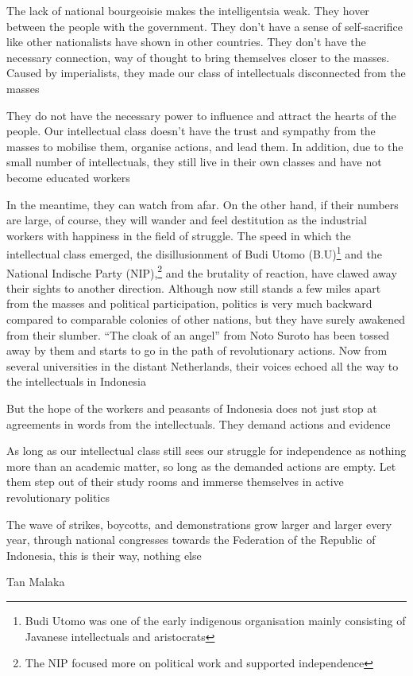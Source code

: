 The lack of national bourgeoisie makes the intelligentsia weak. They hover between the people with the government. 
They don't have a sense of self-sacrifice like other nationalists have shown in other countries. They don't have the 
necessary connection, way of thought to bring themselves closer to the masses. Caused by imperialists, they made our class 
of intellectuals disconnected from the masses\vskip 0.2in

They do not have the necessary power to influence and attract the hearts of the people. Our 
intellectual class doesn't have the trust and sympathy from the masses to mobilise them, organise actions, 
and lead them. In addition, due to the small number of intellectuals, they still live in their own classes and 
have not become educated workers\vskip 0.2in

In the meantime, they can watch from afar. On the other hand, if their numbers are large, of course, 
they will wander and feel destitution as the industrial workers with happiness in the field of struggle.
The speed in which the intellectual class emerged, the disillusionment of Budi Utomo (B.U)\footnote[2]{Budi Utomo was one of the early indigenous organisation mainly consisting of Javanese intellectuals and aristocrats}
and the National Indische Party (NIP),\footnote[3]{The NIP focused more on political work and supported independence}
and the brutality of reaction, have clawed away their sights to another direction. Although now still stands a few miles apart 
from the masses and political participation, politics is very much backward compared to comparable colonies of other nations, 
but they have surely awakened from their slumber. “The cloak of an angel” from Noto Suroto has been tossed away by them and 
starts to go in the path of revolutionary actions. Now from several universities in the distant Netherlands, their voices 
echoed all the way to the intellectuals in Indonesia\vskip 0.2in

But the hope of the workers and peasants of Indonesia does not just stop at agreements in words from the intellectuals. 
They demand actions and evidence\vskip 0.2in

As long as our intellectual class still sees our struggle for independence as nothing more than an academic matter, 
so long as the demanded actions are empty. Let them step out of their study rooms and immerse themselves in active revolutionary politics\vskip 0.2in

The wave of strikes, boycotts, and demonstrations grow larger and larger every year, through national congresses 
towards the Federation of the Republic of Indonesia, this is their way, nothing else\vskip 0.2in

\begin{flushright}
    Tan Malaka
\end{flushright}
